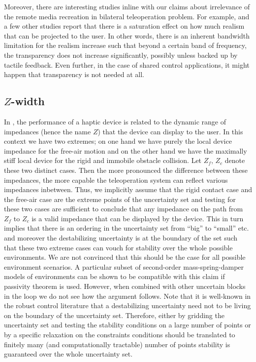 Moreover, there are interesting studies inline with our claims about irrelevance of the remote media recreation in bilateral
teleoperation problem. For example, \cite{kilchenman,wildenbeest,boessenkool} and a few other studies report that there is a saturation
effect on how much realism that can be projected to the user. In other words, there is an inherent bandwidth limitation for 
the realism increase such that beyond a certain band of frequency, the transparency does not increase significantly, possibly
unless backed up by tactile feedback. Even further, in the case of shared control applications, it might happen that transparency 
is not needed at all. 



\subsection{\texorpdfstring{$Z$}{Z}-width}

In \cite{colgate4}, the performance of a haptic device is related to the dynamic range of impedances (hence the name $Z$) that
the device can display to the user. In this context we have two extremes; on one hand we have purely the local device impedance 
for the free-air motion and on the other hand we have the maximally stiff local device for the rigid and immobile obstacle collision. 
Let $Z_f$, $Z_c$ denote these two distinct cases. Then the more pronounced the difference between these impedances, the more 
capable the teleoperation system can reflect various impedances inbetween. Thus, we implicitly assume that the rigid contact 
case and the free-air case are the extreme points of the uncertainty set and testing for these two cases are sufficient to 
conclude that any impedance on the path from $Z_f$ to $Z_c$ is a valid impedance that can be displayed by the device. This
in turn implies that there is an ordering in the uncertainty set from \enquote{big} to \enquote{small} etc. and moreover 
the destabilizing uncertainty is at the boundary of the set such that these two extreme cases can vouch for stability over 
the whole possible environments. We are not convinced that this should be the case for all possible environment 
scenarios. A particular subset of second-order mass-spring-damper models of environments can be shown to be compatible 
with this claim if passivity theorem is used. However, when combined with other uncertain blocks in the loop we do not see
how the argument follows. Note that it is well-known in the robust control literature that a destabilizing uncertainty need
not to be living on the boundary of the uncertainty set. Therefore, either by gridding the uncertainty set and testing the 
stability conditions on a large number of points or by a specific relaxation on the constraints conditions should be 
translated to finitely many (and computationally tractable) number of points stability is guaranteed over the whole 
uncertainty set.

